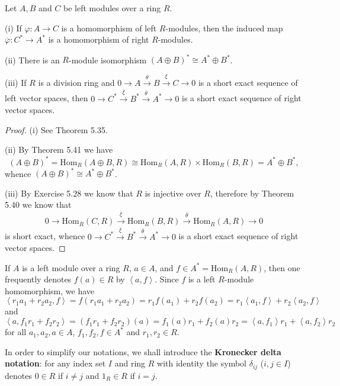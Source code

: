 \begin{theorem}
Let $A,B$ and $C$ be left modules over a ring $R$.\par
(i) If $\varphi:A\to C$ is a homomorphism of left $R$-modules, then the induced map $\overline{\varphi}:C^*\to A^*$ is a homomorphism of right $R$-modules.\par
(ii) There is an $R$-module isomorphism $\left( A\oplus B \right) ^*\cong A^*\oplus B^*$.\par
(iii) If $R$ is a division ring and $0\longrightarrow A\overset{\theta}{\longrightarrow}B\overset{\xi}{\longrightarrow}C\longrightarrow 0$ is a short exact sequence of left vector spaces, then $0\longrightarrow C^*\overset{\overline{\xi }}{\longrightarrow}B^*\overset{\overline{\theta }}{\longrightarrow}A^*\longrightarrow 0$ is a short exact sequence of right vector spaces.
\end{theorem}
\begin{proof}
(i) See Theorem 5.35.\par
(ii) By Theorem 5.41 we have 
$$
\left( A\oplus B \right) ^*=\mathrm{Hom}_R\left( A\oplus B,R \right) \cong \mathrm{Hom}_R\left( A,R \right) \times \mathrm{Hom}_R\left( B,R \right) =A^*\oplus B^*,
$$
whence $\left( A\oplus B \right) ^*\cong A^*\oplus B^*$.\par
(iii) By Exercise 5.28 we know that $R$ is injective over $R$, therefore by Theorem 5.40 we know that 
$$
0\longrightarrow \mathrm{Hom}_R\left( C,R \right) \overset{\overline{\xi }}{\longrightarrow}\mathrm{Hom}_R\left( B,R \right) \overset{\overline{\theta }}{\longrightarrow}\mathrm{Hom}_R\left( A,R \right) \longrightarrow 0
$$
is short exact, whence $0\longrightarrow C^*\overset{\overline{\xi }}{\longrightarrow}B^*\overset{\overline{\theta }}{\longrightarrow}A^*\longrightarrow 0$ is a short exact sequence of right vector spaces.
\end{proof}
If $A$ is a left module over a ring $R$, $a\in A$, and $f\in A^*=\mathrm{Hom}_R(A,R)$, then one frequently denotes $f(a)\in R$ by $\left<a,f\right>$. Since $f$ is a left $R$-module homomorphism, we have 
$$
\left< r_1a_1+r_2a_2,f \right> =f\left( r_1a_1+r_2a_2 \right) =r_1f\left( a_1 \right) +r_2f\left( a_2 \right) =r_1\left< a_1,f \right> +r_2\left< a_2,f \right> 
$$
and 
$$
\left< a,f_1r_1+f_2r_2 \right> =\left( f_1r_1+f_2r_2 \right) \left( a \right) =f_1\left( a \right) r_1+f_2\left( a \right) r_2=\left< a,f_1 \right> r_1+\left< a,f_2 \right> r_2
$$
for all $a_1,a_2,a\in A$, $f_1,f_2,f\in A^*$ and $r_1,r_2\in R$.\par
In order to simplify our notations, we shall introduce the \textbf{Kronecker delta notation}: for any index set $I$ and ring $R$ with identity the symbol $\delta_{ij}$ ($i,j\in I$) denotes $0\in R$ if $i\ne j$ and $1_R\in R$ if $i=j$.
